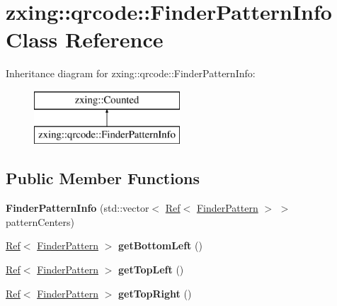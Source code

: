 \hypertarget{classzxing_1_1qrcode_1_1_finder_pattern_info}{}\section{zxing\+:\+:qrcode\+:\+:Finder\+Pattern\+Info Class Reference}
\label{classzxing_1_1qrcode_1_1_finder_pattern_info}
Inheritance diagram for zxing\+:\+:qrcode\+:\+:Finder\+Pattern\+Info\+:\begin{figure}[H]
\begin{center}
\leavevmode
\includegraphics[height=2.000000cm]{classzxing_1_1qrcode_1_1_finder_pattern_info}
\end{center}
\end{figure}
\subsection*{Public Member Functions}
\begin{DoxyCompactItemize}
\item 
\mbox{\label{classzxing_1_1qrcode_1_1_finder_pattern_info_a5c87b7db2d9e90adff90328ed8ea2106}} 
{\bfseries Finder\+Pattern\+Info} (std\+::vector$<$ \mbox{\hyperlink{classzxing_1_1_ref}{Ref}}$<$ \mbox{\hyperlink{classzxing_1_1qrcode_1_1_finder_pattern}{Finder\+Pattern}} $>$ $>$ pattern\+Centers)
\item 
\mbox{\label{classzxing_1_1qrcode_1_1_finder_pattern_info_aa55620204c060a2d971b064d533fa8da}} 
\mbox{\hyperlink{classzxing_1_1_ref}{Ref}}$<$ \mbox{\hyperlink{classzxing_1_1qrcode_1_1_finder_pattern}{Finder\+Pattern}} $>$ {\bfseries get\+Bottom\+Left} ()
\item 
\mbox{\label{classzxing_1_1qrcode_1_1_finder_pattern_info_a7a086e06d273a66a811fced9a98229cb}} 
\mbox{\hyperlink{classzxing_1_1_ref}{Ref}}$<$ \mbox{\hyperlink{classzxing_1_1qrcode_1_1_finder_pattern}{Finder\+Pattern}} $>$ {\bfseries get\+Top\+Left} ()
\item 
\mbox{\label{classzxing_1_1qrcode_1_1_finder_pattern_info_a0953fa987ae34effd5746b8bda8a2b0d}} 
\mbox{\hyperlink{classzxing_1_1_ref}{Ref}}$<$ \mbox{\hyperlink{classzxing_1_1qrcode_1_1_finder_pattern}{Finder\+Pattern}} $>$ {\bfseries get\+Top\+Right} ()
\end{DoxyCompactItemize}


